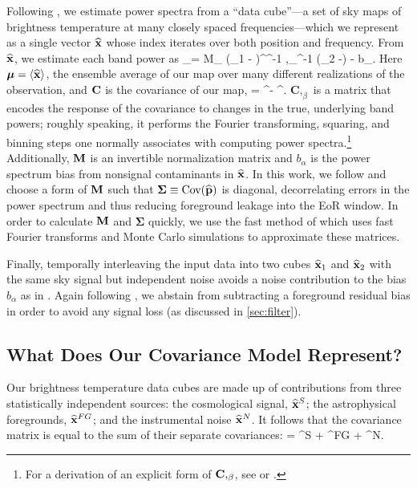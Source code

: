 Following \cite{LT11,DillonFast,X13}, we estimate power spectra from a ``data cube''---a set of sky maps of brightness temperature at many closely spaced frequencies---which we represent as a single vector $\widehat{\mathbf{x}}$ whose index iterates over both position and frequency. From $\widehat{\mathbf{x}}$, we estimate each band power as
\beq
{}_\alpha = M_{\alpha\beta} \left(\xhat_1 - \mean\right)^\trans \CC^{-1} ,_\beta \CC^{-1} \left(\xhat_2 -\mean\right) - b_\alpha. \label{eq:QuadEst}
\eeq
Here $\boldsymbol\mu = \langle \widehat{\mathbf{x}} \rangle$, the ensemble average of our map over many different realizations of the observation, and $\mathbf{C}$ is the covariance of our map,
\beq
\CC = \langle \xhat \xhat^\trans \rangle - \langle \xhat \rangle  \langle \xhat \rangle^\trans.
\eeq 
$\mathbf{C},_\beta$ is a matrix that encodes the response of the covariance to changes in the true, underlying band powers; roughly speaking, it performs the Fourier transforming, squaring, and binning steps one normally associates with computing power spectra.\footnote{For a derivation of an explicit form of $\mathbf{C},_\beta$, see \cite{LT11} or \cite{DillonFast}.}  Additionally, $\mathbf{M}$ is an invertible normalization matrix and $b_\alpha$ is the power spectrum bias from nonsignal contaminants in $\widehat{\mathbf{x}}$. In this work, we follow \cite{X13} and choose a form of $\mathbf{M}$ such that $\boldsymbol\Sigma \equiv \text{Cov}(\widehat{\mathbf{p}})$ is diagonal, decorrelating errors in the power spectrum and thus reducing foreground leakage into the EoR window. In order to calculate $\mathbf{M}$ and $\boldsymbol\Sigma$ quickly, we use the fast method of \cite{DillonFast} which uses fast Fourier transforms and Monte Carlo simulations to approximate these matrices.

Finally, temporally interleaving the input data into two cubes $\widehat{\mathbf{x}}_1$ and $\widehat{\mathbf{x}}_2$ with the same sky signal but independent noise avoids a noise contribution to the bias $b_\alpha$ as in \cite{X13}. Again following \cite{X13}, we abstain from subtracting a foreground residual bias in order to avoid any signal loss (as discussed in \ref{sec:filter}).


\subsection{What Does Our Covariance Model Represent?} \label{sec:CovTheory}

Our brightness temperature data cubes are made up of contributions from three statistically independent sources: the cosmological signal, $\widehat{\mathbf{x}}^S$; the astrophysical foregrounds, $\widehat{\mathbf{x}}^{FG}$; and the instrumental noise $\widehat{\mathbf{x}}^N$. It follows that the covariance matrix is equal to the sum of their separate covariances:
\beq
\CC = \CC^S + \CC^{FG} + \CC^N.
\eeq

